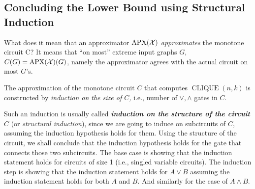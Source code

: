 %


\subsection{Concluding the Lower Bound using Structural Induction    }



% 



What does it mean that an approximator $\mathrm{APX}(\mathcal X)$ \emph{approximates} the monotone circuit C? It means that ``on most'' extreme input graphs $G$, $C(G) = \mathrm{APX}(\mathcal X)(G)$, namely the approximator agrees with the actual circuit on most $G$'s. 

The approximation of the  monotone circuit $C$ that computes $\operatorname{CLIQUE}(n, k)$ is constructed  by\emph{ induction on the size of $C$,} i.e., number of $\lor, \wedge$ gates in $C$.


\begin{tcolorbox}[colframe=white, colback=gray!11, boxrule=0mm, sharp corners]
\begin{note} Such an induction is usually called \emph{\textbf{induction on the structure of the circuit} $C$} (or \emph{structural induction}), since we are going to induce on subcircuits of $C$, assuming the induction hypothesis holds for them. Using the structure of the circuit, we shall conclude that the induction hypothesis  holds for the gate that connects those two subcircuits. The base case is showing that the induction statement holds for circuits of size 1 (i.e., singled variable circuits). The induction step is showing that the induction statement holds for $A\lor B$ assuming the induction statement holds for both $A$ and $B$. And similarly for the case of $A\land B$.     
\end{note}
\end{tcolorbox}

